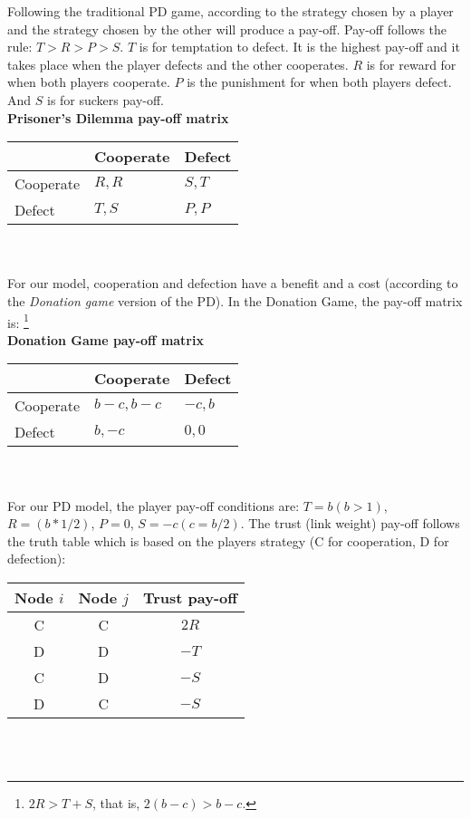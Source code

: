 \documentclass[11pt]{article}
\begin{document}
Following the traditional PD game, according to the strategy chosen by a player and the strategy chosen by the other will produce a pay-off. Pay-off follows the rule: $T > R > P > S$. $T$ is for temptation to defect. It is the highest pay-off and it takes place when the player defects and the other cooperates. $R$ is for reward for when both players cooperate. $P$ is the punishment for when both players defect. And $S$ is for suckers pay-off.\\

{\bf Prisoner's Dilemma pay-off matrix}\\

\begin{tabular}{| l | l | l |}
\hline
          & Cooperate & Defect \\ \hline
Cooperate &  $R,R$      &  $S,T$   \\ \hline
Defect    &  $T,S$      &  $P,P$   \\ \hline

\end{tabular}\\ \\

For our model, cooperation and defection have a benefit and a cost (according to the \emph{Donation game} version of the PD). In the Donation Game, the pay-off matrix is: \footnote{$2R > T + S$, that is, $2(b-c) > b-c$.}\\

{\bf Donation Game pay-off matrix}\\

\begin{tabular}{| l | l | l |}
\hline
          & Cooperate & Defect \\ \hline
Cooperate & $b-c, b-c$ & $-c,b$   \\ \hline
Defect    &  $b,-c$    & $0,0$   \\ \hline

\end{tabular}\\ \\

For our PD model, the player pay-off conditions are: $T = b(b > 1)$, $R = (b * 1/2)$, $P = 0$, $S = -c(c = b/2)$. The trust (link weight) pay-off follows the truth table which is based on the players strategy (C for cooperation, D for defection):\\

\begin{tabular}{| c | c || c |}
\hline

Node $i$ & Node $j$ & Trust pay-off  \\ \hline
      C  &       C  &  $2R$ \\ \hline
      D  &       D  &  $-T$ \\ \hline
      C  &       D  &  $-S$ \\ \hline
      D  &       C  &  $-S$ \\ \hline

\end{tabular}\\ \\
\end{document}
